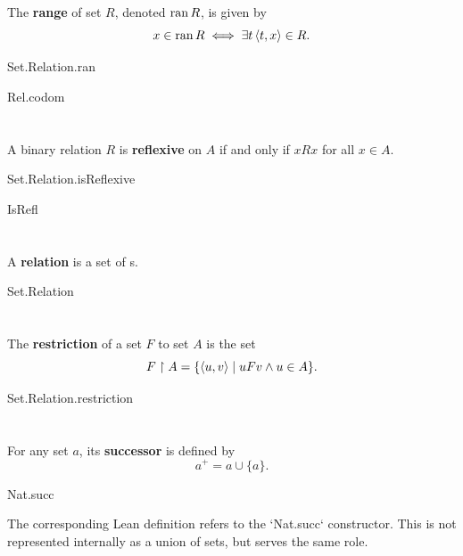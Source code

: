 \documentclass{report}
\begin{document}
  The \textbf{range} of set $R$, denoted $\mathop{\text{ran}}{R}$, is given by
    $$x \in \mathop{\text{ran}}{R} \iff \exists t \left< t, x \right> \in R.$$

    {Set.Relation.ran}

    {Rel.codom}

\section{}%

  A binary relation $R$ is \textbf{reflexive} on $A$ if and only if $xRx$ for
    all $x \in A$.

    {Set.Relation.isReflexive}

    {IsRefl}

\section{}%

  A \textbf{relation} is a set of s.

    {Set.Relation}


\section{}%

  The \textbf{restriction} of a set $F$ to set $A$ is the set
    $$F \restriction A = \{\left< u, v \right> \mid uFv \land u \in A\}.$$

    {Set.Relation.restriction}

\section{}%

  For any set $a$, its \textbf{successor} is defined by $$a^+ = a \cup \{a\}.$$

    {Nat.succ}

  \begin{note}
    The corresponding Lean definition refers to the `Nat.succ` constructor.
    This is not represented internally as a union of sets, but serves the same
      role.
  \end{note}
\end{document}
